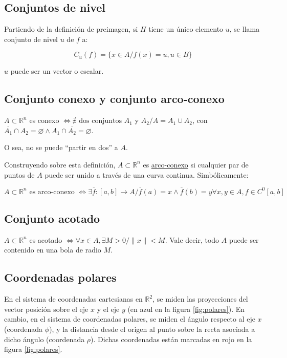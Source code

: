 \documentclass{article}
\renewcommand{\Bbb}{\mathbb}
\begin{document}
\subsection{Conjuntos de nivel}

Partiendo de la definición de preimagen, si $H$ tiene un único elemento $u$, se llama conjunto de nivel $u$ de $f$ a:

\begin{equation}
C_u(f) = \{ x \in A / f(x) = u, u \in B \}
\end{equation}

$u$ puede ser un vector o escalar.

\subsection{Conjunto conexo y conjunto arco-conexo}

$A \subset \Bbb R^n$ es conexo $\Longleftrightarrow \nexists \text{ dos conjuntos } A_1$ y $A_2 / A = A_1 \cup A_2$, con $\overline{A_1} \cap A_2 = \varnothing \wedge A_1 \cap \overline{A_2} = \varnothing$.

O sea, no se puede ``partir en dos'' a $A$.

Construyendo sobre esta definición, $A \subset \Bbb R^n$ es \underline{arco-conexo} si cualquier par de puntos de $A$ puede ser unido a través de una curva continua. Simbólicamente:

\begin{equation}
A \subset \Bbb R^n \text{ es arco-conexo } \Longleftrightarrow \exists \overline{f}: [a,b] \rightarrow A / \overline{f}(a) = x \wedge \overline{f}(b) = y \forall x,y \in A, f \in C^0[a,b]
\end{equation}

\subsection{Conjunto acotado}

$A \subset \Bbb R^n$ es acotado $\Longleftrightarrow \forall x \in A, \exists M > 0 / \|x\| < M$. Vale decir, todo $A$ puede ser contenido en una bola de radio $M$.

\subsection{Coordenadas polares}

En el sistema de coordenadas cartesianas en $\Bbb R^2$, se miden las proyecciones del vector posición sobre el eje $x$ y el eje $y$ (en azul en la figura \ref{fig:polares}). En cambio, en el sistema de coordenadas polares, se miden el ángulo respecto al eje $x$ (coordenada $\phi$), y la distancia desde el origen al punto sobre la recta asociada a dicho ángulo (coordenada $\rho$). Dichas coordenadas están marcadas en rojo en la figura \ref{fig:polares}.
\end{document}
